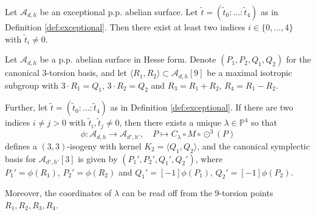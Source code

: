\documentclass[10pt,a4paper]{amsart}
\newcommand{\A}{\mathcal{A}}
\newcommand{\PP}{\mathbb{P}}
\newcommand{\cube}{\odot^3}
\begin{document}
\begin{lemma} \label{lem:exceptional-points}
    Let $\A_{d,h}$ be an exceptional p.p. abelian surface. Let $\tilde{t}=(\tilde t_0: \dots: \tilde t_4) $ as in  Definition \ref{def:exceptional}. Then there exist at least two indices $i \in \{0, \dots, 4\}$  with $\tilde t_i \neq 0$.
\end{lemma}

\begin{proposition} \label{prop:isogeny-formula-exceptional}
    Let $\A_{d,h}$ be a p.p. abelian surface in Hesse form. Denote $(P_1,P_2,Q_1,Q_2)$ for the canonical $3$-torsion basis, and let 
    \(
    \langle R_1,R_2\rangle \subset \A_{d,h}[9]
    \) be a maximal isotropic subgroup with $3 \cdot R_1  =  Q_1$, $3 \cdot R_2  =  Q_2$  and $R_3 = R_1 + R_2$, $R_4 = R_1 - R_2$. %
    
    Further, let $\tilde{t} = (\tilde{t}_0: \dots: \tilde{t}_4)$ as in Definition \ref{def:exceptional}. If there are two indices $i \neq j >0$ with $\tilde{t}_i, \tilde{t}_j \neq 0$, then there exists a unique $\lambda \in \PP^4$ so that 
    \[
    \phi: \A_{d,h} \to \A_{d',h'}, \quad P \mapsto C_\lambda \circ M \circ \cube(P)
    \]
    defines a $(3,3)$-isogeny with kernel $K_2 = \langle Q_1, Q_2\rangle$, and the canonical symplectic basis for $\A_{d',h'}[3]$ is given by  $(P_1',P_2',Q_1',Q_2')$, where $P_1' = \phi(R_1), \, P_2' = \phi(R_2)$ and $Q_1' = [-1]\phi(P_1), \, Q_2' = [-1]\phi(P_2)$. 
    
    Moreover, the coordinates of $\lambda$ can be read off from the $9$-torsion points $R_1,R_2,R_3,R_4$.
\end{proposition}
\end{document}

